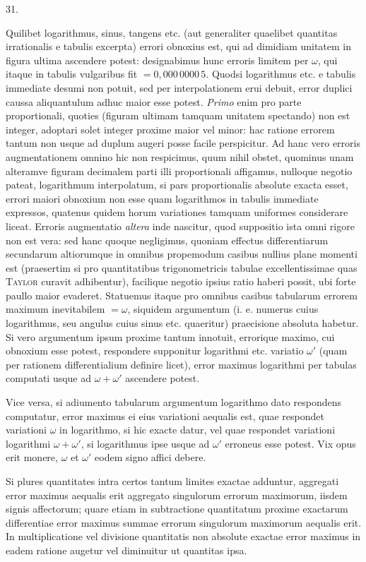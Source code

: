 \begin{center}
\hypertarget{native-046-article031}{}31.
\end{center}
Quilibet logarithmus, sinus, tangens etc. (aut generaliter quaelibet quantitas irrationalis e tabulis excerpta) errori obnoxius est, qui ad dimidiam unitatem in figura ultima ascendere potest: designabimus hunc erroris limitem per $\omega$, qui itaque in tabulis vulgaribus fit $=0{,}000\,0000\,5$. Quodsi logarithmus etc. e tabulis immediate desumi non potuit, sed per interpolationem erui debuit, error duplici caussa aliquantulum adhuc maior esse potest. \emph{Primo} enim pro parte proportionali, quoties (figuram ultimam tamquam unitatem spectando) non est integer, adoptari solet integer proxime maior vel minor: hac ratione errorem tantum non usque ad duplum augeri posse facile perspicitur. Ad hanc vero erroris augmentationem omnino hic non respicimus, quum nihil obstet, quominus unam alteramve figuram decimalem parti illi proportionali affigamus, nulloque negotio pateat, logarithmum interpolatum, si pars proportionalis absolute exacta esset, errori maiori obnoxium non esse quam logarithmos in tabulis immediate expressos, quatenus quidem horum variationes tamquam uniformes considerare liceat. Erroris augmentatio \emph{altera} inde nascitur, quod suppositio ista omni rigore non est vera: sed hanc quoque negligimus, quoniam effectus differentiarum secundarum altiorumque in omnibus propemodum casibus nullius plane momenti est (praesertim si pro quantitatibus trigonometricis tabulae excellentissimae quas \textsc{Taylor} curavit adhibentur), facilique negotio ipsius ratio haberi possit, ubi forte paullo maior evaderet. Statuemus itaque pro omnibus casibus tabularum errorem maximum inevitabilem $=\omega$, siquidem argumentum (i. e. numerus cuius logarithmus, seu angulus cuius sinus etc. quaeritur) praecisione absoluta habetur. Si vero argumentum ipsum proxime tantum innotuit, errorique maximo, cui obnoxium esse potest, respondere supponitur logarithmi etc. variatio $\omega'$ (quam per rationem differentialium definire licet), error maximus logarithmi per tabulas computati usque ad $\omega+\omega'$ ascendere potest.

Vice versa, si adiumento tabularum argumentum logarithmo dato respondens computatur, error maximus ei eius variationi aequalis est, quae respondet variationi $\omega$ in logarithmo, si hic exacte datur, vel quae respondet variationi logarithmi $\omega+\omega'$, si logarithmus ipse usque ad $\omega'$ erroneus esse potest. Vix opus erit monere, $\omega$ et $\omega'$ eodem signo affici debere.

Si plures quantitates intra certos tantum limites exactae adduntur, aggregati error maximus aequalis erit aggregato singulorum errorum maximorum, iisdem signis affectorum; quare etiam in subtractione quantitatum proxime exactarum differentiae error maximus summae errorum singulorum maximorum aequalis erit. In multiplicatione vel divisione quantitatis non absolute exactae error maximus in eadem ratione augetur vel diminuitur ut quantitas ipsa.

